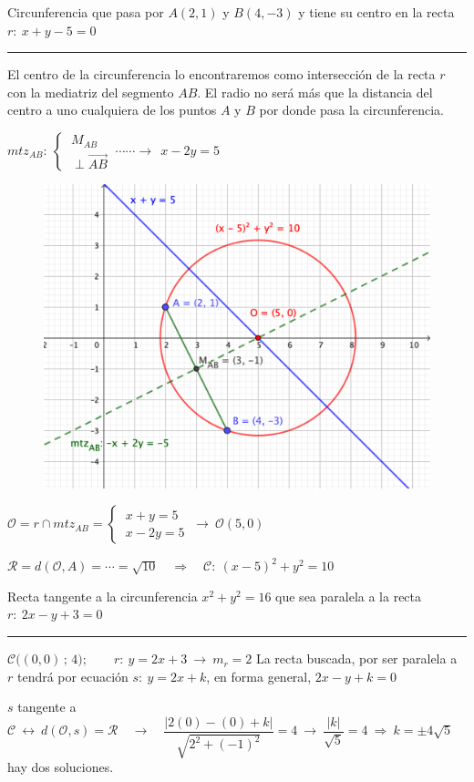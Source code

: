 \begin{miejercicio}

Circunferencia que pasa por $A(2,1)$ y $B(4,-3)$ y tiene su centro en la recta $r:\ x+y-5=0$

\rule{250pt}{0.1pt}

\begin{multicols}{2}
El centro de la circunferencia lo encontraremos como intersección de la recta $r$ con la mediatriz del segmento $AB$. El radio no será más que la distancia del centro a uno cualquiera de los puntos $A$ y $B$ por donde pasa la circunferencia.

\vspace{2mm} $mtz_{AB}:\ \begin{cases} \ M_{AB} \\ \ \perp \overrightarrow{AB} \end{cases} \ \cdots \cdots \to \ \ x-2y=5$


\begin{figure}[H]
	\centering
	\includegraphics[width=.5\textwidth]{img-conicas/conicas23.png}
	\end{figure}	
\end{multicols}
 $\mathcal O = r \cap mtz_{AB}=\begin{cases} \ x+y=5 \\ \ x-2y=5 \end{cases} \ \to \ \mathcal O(5,0)$

\vspace{2mm} $\mathcal R=d(\mathcal O,A)=\cdots =	\sqrt{10} \quad \Rightarrow \quad \mathcal C:\ (x-5)^2+y^2=10$	
\end{miejercicio}


\begin{miejercicio}

Recta tangente a la circunferencia $x^2+y^2=16$ que sea paralela a la recta $r:\ 2x-y+3=0$

\rule{250pt}{0.1pt}

\vspace{2mm}$\mathcal C \big( (0,0)\, ; \, 4\Big);\qquad r:\ y=2x+3 \ \to \ m_r=2$ La recta buscada, por ser paralela a $r$ tendrá por ecuación $s:\ y=2x+k$, en forma general, $2x-y+k=0$

\vspace{2mm} $s$ tangente a $ \mathcal C \ \leftrightarrow \ d(\mathcal O, s)=\mathcal R \quad \to \quad \dfrac{ |2(0)-(0)+k| }{ \sqrt{ 2^2+(-1)^2 } }=4 \  \to \ \dfrac{|k|}{\sqrt{5}}=4 \ \Rightarrow \ k=\pm 4\sqrt{5}\ $ hay dos soluciones.	
\end{miejercicio}


